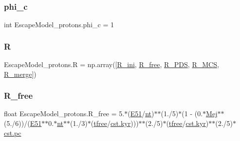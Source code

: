 \subsubsection{\texorpdfstring{phi\+\_\+c}{phi\_c}}
{\footnotesize\ttfamily int Escape\+Model\+\_\+protons.\+phi\+\_\+c = 1}

\mbox{\label{namespaceEscapeModel__protons_abfcf283e47a228187b9074e881a147a5}} 
\subsubsection{\texorpdfstring{R}{R}}
{\footnotesize\ttfamily Escape\+Model\+\_\+protons.\+R = np.\+array(\mbox{[}\hyperlink{namespaceEscapeModel__protons_a4ec407fdcf80cbc71064f7ae764172a3}{R\+\_\+ini}, \hyperlink{namespaceEscapeModel__protons_a47e27e0a65ee1e150a7746ec8e3005f8}{R\+\_\+free}, \hyperlink{namespaceEscapeModel__protons_ac5a3e8b56d87041211af9505b84285a2}{R\+\_\+\+P\+DS}, \hyperlink{namespaceEscapeModel__protons_aaef65e116864c69f102886c8be38d093}{R\+\_\+\+M\+CS}, \hyperlink{namespaceEscapeModel__protons_ab7bac72484f50ec2672ae7528e7aa0c3}{R\+\_\+merge}\mbox{]})}

\mbox{\label{namespaceEscapeModel__protons_a47e27e0a65ee1e150a7746ec8e3005f8}} 
\subsubsection{\texorpdfstring{R\+\_\+free}{R\_free}}
{\footnotesize\ttfamily float Escape\+Model\+\_\+protons.\+R\+\_\+free = 5.$\ast$(\hyperlink{namespaceEscapeModel__protons_af064ce6137662206b44cb8189188c577}{E51}/\hyperlink{namespaceEscapeModel__protons_aea8f96db5e10e84cf033c2f0000e9642}{nt})$\ast$$\ast$(1./5)$\ast$(1 -\/ (0.$\ast$\hyperlink{namespaceEscapeModel__protons_a55a313f4e7119d936467f0bf634eefec}{Mej}$\ast$$\ast$(5./6))/(\hyperlink{namespaceEscapeModel__protons_af064ce6137662206b44cb8189188c577}{E51}$\ast$$\ast$0.$\ast$\hyperlink{namespaceEscapeModel__protons_aea8f96db5e10e84cf033c2f0000e9642}{nt}$\ast$$\ast$(1./3)$\ast$(\hyperlink{namespaceEscapeModel__protons_ab0de8bc17835b3b00d3ab940c83c199f}{tfree}/\hyperlink{constants_8h_a0edf155739e92555799f4a04b10af6bf}{cst.\+kyr})))$\ast$$\ast$(2./5)$\ast$(\hyperlink{namespaceEscapeModel__protons_ab0de8bc17835b3b00d3ab940c83c199f}{tfree}/\hyperlink{constants_8h_a0edf155739e92555799f4a04b10af6bf}{cst.\+kyr})$\ast$$\ast$(2./5)$\ast$\hyperlink{constants_8h_a2884cd030c4c825754349a525a1d06ce}{cst.\+pc}}

